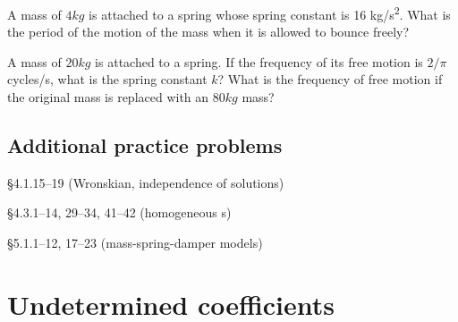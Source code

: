 \begin{question}
A mass of  \(4 \si{kg}\) is attached to a spring whose spring constant is 16 \si{kg/s^2}. What is the period of the motion of the mass when it is allowed to bounce freely?
\end{question}

\begin{question}
A mass of \(20 \si{kg}\) is attached to a spring. If the frequency of its free motion is $2/\pi$ cycles/s,
what is the spring constant $k$? What is the frequency of free motion if the original mass is replaced with an \(80 \si{kg}\) mass?
\end{question}

\subsection*{Additional practice problems}

\begin{compactenum}[(a)]
\item {} \S 4.1.15--19 (Wronskian, independence of solutions)
\item {} \S 4.3.1--14, 29--34, 41--42 (homogeneous \ode{}s)
\item {} \S 5.1.1--12, 17--23 (mass-spring-damper models)
\end{compactenum}




\section{Undetermined coefficients}

